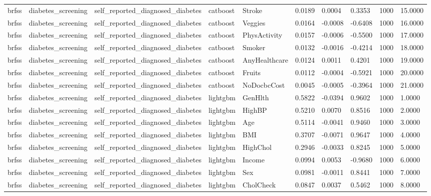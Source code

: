 \begin{tabular}{llllllllll}
brfss & diabetes\_screening & self\_reported\_diagnosed\_diabetes & catboost & Stroke & 0.0189 & 0.0004 & 0.3353 & 1000 & 15.0000 \\
brfss & diabetes\_screening & self\_reported\_diagnosed\_diabetes & catboost & Veggies & 0.0164 & -0.0008 & -0.6408 & 1000 & 16.0000 \\
brfss & diabetes\_screening & self\_reported\_diagnosed\_diabetes & catboost & PhysActivity & 0.0157 & -0.0006 & -0.5500 & 1000 & 17.0000 \\
brfss & diabetes\_screening & self\_reported\_diagnosed\_diabetes & catboost & Smoker & 0.0132 & -0.0016 & -0.4214 & 1000 & 18.0000 \\
brfss & diabetes\_screening & self\_reported\_diagnosed\_diabetes & catboost & AnyHealthcare & 0.0124 & 0.0011 & 0.4201 & 1000 & 19.0000 \\
brfss & diabetes\_screening & self\_reported\_diagnosed\_diabetes & catboost & Fruits & 0.0112 & -0.0004 & -0.5921 & 1000 & 20.0000 \\
brfss & diabetes\_screening & self\_reported\_diagnosed\_diabetes & catboost & NoDocbcCost & 0.0045 & -0.0005 & -0.3964 & 1000 & 21.0000 \\
brfss & diabetes\_screening & self\_reported\_diagnosed\_diabetes & lightgbm & GenHlth & 0.5822 & -0.0394 & 0.9602 & 1000 & 1.0000 \\
brfss & diabetes\_screening & self\_reported\_diagnosed\_diabetes & lightgbm & HighBP & 0.5210 & 0.0070 & 0.8516 & 1000 & 2.0000 \\
brfss & diabetes\_screening & self\_reported\_diagnosed\_diabetes & lightgbm & Age & 0.5114 & -0.0041 & 0.9460 & 1000 & 3.0000 \\
brfss & diabetes\_screening & self\_reported\_diagnosed\_diabetes & lightgbm & BMI & 0.3707 & -0.0071 & 0.9647 & 1000 & 4.0000 \\
brfss & diabetes\_screening & self\_reported\_diagnosed\_diabetes & lightgbm & HighChol & 0.2946 & -0.0033 & 0.8245 & 1000 & 5.0000 \\
brfss & diabetes\_screening & self\_reported\_diagnosed\_diabetes & lightgbm & Income & 0.0994 & 0.0053 & -0.9680 & 1000 & 6.0000 \\
brfss & diabetes\_screening & self\_reported\_diagnosed\_diabetes & lightgbm & Sex & 0.0981 & -0.0011 & 0.8441 & 1000 & 7.0000 \\
brfss & diabetes\_screening & self\_reported\_diagnosed\_diabetes & lightgbm & CholCheck & 0.0847 & 0.0037 & 0.5462 & 1000 & 8.0000 \\

\end{tabular}
